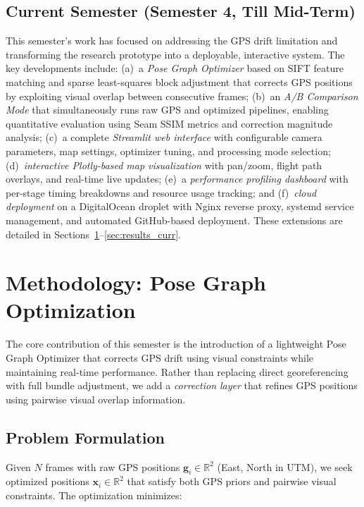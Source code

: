 \documentclass[conference]{IEEEtran}
\begin{document}
\subsection{Current Semester (Semester 4, Till Mid-Term)}

This semester's work has focused on addressing the GPS drift limitation and transforming the research prototype into a deployable, interactive system. The key developments include: (a)~a \textit{Pose Graph Optimizer} based on SIFT feature matching and sparse least-squares block adjustment that corrects GPS positions by exploiting visual overlap between consecutive frames; (b)~an \textit{A/B Comparison Mode} that simultaneously runs raw GPS and optimized pipelines, enabling quantitative evaluation using Seam SSIM metrics and correction magnitude analysis; (c)~a complete \textit{Streamlit web interface} with configurable camera parameters, map settings, optimizer tuning, and processing mode selection; (d)~\textit{interactive Plotly-based map visualization} with pan/zoom, flight path overlays, and real-time live updates; (e)~a \textit{performance profiling dashboard} with per-stage timing breakdowns and resource usage tracking; and (f)~\textit{cloud deployment} on a DigitalOcean droplet with Nginx reverse proxy, systemd service management, and automated GitHub-based deployment. These extensions are detailed in Sections~\ref{sec:posegraph}--\ref{sec:results_curr}.


\section{Methodology: Pose Graph Optimization}
\label{sec:posegraph}

The core contribution of this semester is the introduction of a lightweight Pose Graph Optimizer that corrects GPS drift using visual constraints while maintaining real-time performance. Rather than replacing direct georeferencing with full bundle adjustment, we add a \textit{correction layer} that refines GPS positions using pairwise visual overlap information.

\subsection{Problem Formulation}

Given $N$ frames with raw GPS positions $\mathbf{g}_i \in \mathbb{R}^2$ (East, North in UTM), we seek optimized positions $\mathbf{x}_i \in \mathbb{R}^2$ that satisfy both GPS priors and pairwise visual constraints. The optimization minimizes:
\end{document}

